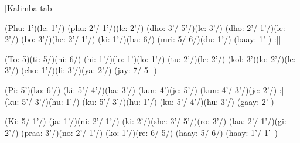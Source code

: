 \documentclass[11pt]{article}
\begin{document}
[Kalimba tab]
\begin{jianpu}
(Phu: 1')(le: 1'/) (phu: 2'/ 1'/)(le: 2'/) (dho: 3'/ 5'/)(le: 3'/) (dho: 2'/ 1'/)(le: 2'/)
(bo: 3'/)(he: 2'/ 1'/) (ki: 1'/)(ba: 6/) (mri: 5/ 6/)(du: 1'/) (baay: 1'-) :||

(To: 5)(ti: 5/)(ni: 6/) (hi: 1'/)(lo: 1')(lo: 1'/) (tu: 2'/)(le: 2'/)
(kol: 3')(lo: 2'/)(le: 3'/) (cho: 1'/)(li: 3'/)(ya: 2'/) (jay: 7/ 5 -)

(Pi: 5')(ko: 6'/) (ki: 5'/ 4'/)(ba: 3'/) (kun: 4')(je: 5'/) (kun: 4'/ 3'/)(je: 2'/) :|
(ku: 5'/ 3'/)(hu: 1'/) (ku: 5'/ 3'/)(hu: 1'/) (ku: 5'/ 4'/)(hu: 3'/) (gaay: 2'-)

(Ki: 5/ 1'/) (ja: 1'/)(ni: 2'/ 1'/) (ki: 2'/)(she: 3'/ 5'/)(ro: 3'/) (laa: 2'/ 1'/)(gi: 2'/)
(praa: 3'/)(no: 2'/ 1'/) (ko: 1'/)(re: 6/ 5/) (haay: 5/ 6/) (haay: 1'/ 1'--)
\end{jianpu}
\end{document}
